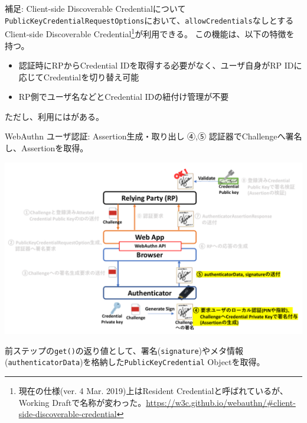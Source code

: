 \documentclass[12pt,dvipdfmx,uplatex]{beamer}
\begin{document}
\begin{frame}
\begin{exampleblock}{\footnotesize 補足: Client-side Discoverable Credentialについて}
\small
\texttt{PublicKeyCredentialRequestOptions}において、\texttt{allowCredentials}なしとするClient-side Discoverable Credential\footnote[frame]{\scriptsize 現在の仕様(ver. 4 Mar. 2019)上はResident Credentialと呼ばれているが、Working Draftで名称が変わった。\url{https://w3c.github.io/webauthn/\#client-side-discoverable-credential}}が利用できる。
この機能は、以下の特徴を持つ。
\begin{itemize}
\item 認証時にRPからCredential IDを取得する必要がなく、ユーザ自身がRP IDに応じてCredentialを切り替え可能
\item RP側でユーザ名などとCredential IDの紐付け管理が不要
\end{itemize}
ただし、利用にはがある。
\end{exampleblock}
\end{frame}


\begin{frame}{WebAuthn ユーザ認証: Assertion生成・取り出し}
\small
④,⑤ 認証器でChallengeへ署名し、Assertionを取得。
\begin{center}
\includegraphics[width=0.9\linewidth]{Figs/webauthn-authentication3.pdf}
\end{center}
前ステップの\texttt{get()}の返り値として、署名(\texttt{signature})やメタ情報(\texttt{authenticatorData})を格納した\texttt{PublicKeyCredential} Objectを取得。
\end{frame}
\end{document}
